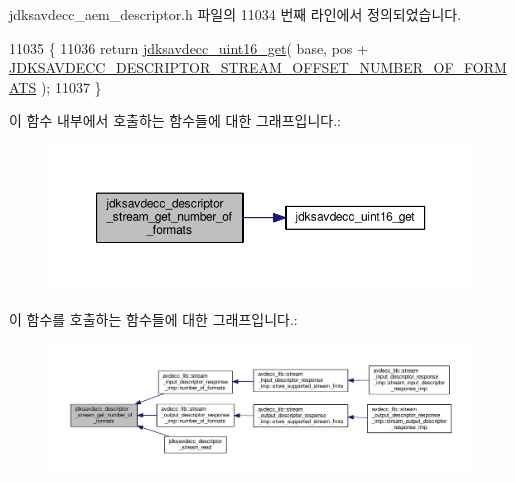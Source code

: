 jdksavdecc\+\_\+aem\+\_\+descriptor.\+h 파일의 11034 번째 라인에서 정의되었습니다.


\begin{DoxyCode}
11035 \{
11036     \textcolor{keywordflow}{return} \hyperlink{group__endian_ga3fbbbc20be954aa61e039872965b0dc9}{jdksavdecc\_uint16\_get}( base, pos + 
      \hyperlink{group__descriptor__stream_ga1d6bd1e205a6ee825efcb6e8291da077}{JDKSAVDECC\_DESCRIPTOR\_STREAM\_OFFSET\_NUMBER\_OF\_FORMATS} 
      );
11037 \}
\end{DoxyCode}


이 함수 내부에서 호출하는 함수들에 대한 그래프입니다.\+:
\nopagebreak
\begin{figure}[H]
\begin{center}
\leavevmode
\includegraphics[width=350pt]{group__descriptor__stream_gaeb76e60867af744978aafba4150e1f83_cgraph}
\end{center}
\end{figure}




이 함수를 호출하는 함수들에 대한 그래프입니다.\+:
\nopagebreak
\begin{figure}[H]
\begin{center}
\leavevmode
\includegraphics[width=350pt]{group__descriptor__stream_gaeb76e60867af744978aafba4150e1f83_icgraph}
\end{center}
\end{figure}


